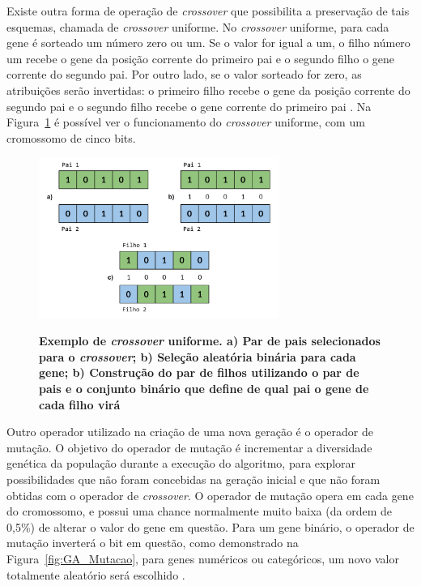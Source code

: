 \documentclass[12pt,oneside,a4paper,english,french,spanish,brazil,]{abntex2}
\begin{document}
Existe outra forma de operação de \textit{crossover} que possibilita a preservação de tais esquemas, chamada de \textit{crossover} uniforme. No \textit{crossover} uniforme, para cada gene é sorteado um número zero ou um. Se o valor for igual a um, o filho número um recebe o gene da posição corrente do primeiro pai e o segundo filho o gene corrente do segundo pai. Por outro lado, se o valor sorteado for zero, as atribuições serão invertidas: o primeiro filho recebe o gene da posição corrente do segundo pai e o segundo filho recebe o gene corrente do primeiro pai \cite{linden:2008}. Na Figura~\ref{fig:GA_Crossover_Uniforme} é possível ver o funcionamento do \textit{crossover} uniforme, com um cromossomo de cinco bits.

\begin{figure}[ht]
\centering
\caption{\textbf{Exemplo de \textit{crossover} uniforme. a) Par de pais selecionados para o \textit{crossover}; b) Seleção aleatória binária para cada gene; b) Construção do par de filhos utilizando o par de pais e o conjunto binário que define de qual pai o gene de cada filho virá}}
\includegraphics[width=0.7\textwidth]{imagens/GA_Crossover_Uniforme.pdf}
\label{fig:GA_Crossover_Uniforme}
\end{figure}

Outro operador utilizado na criação de uma nova geração é o operador de mutação. O objetivo do operador de mutação é incrementar a diversidade genética da população durante a execução do algoritmo, para explorar possibilidades que não foram concebidas na geração inicial e que não foram obtidas com o operador de \textit{crossover}. O operador de mutação opera em cada gene do cromossomo, e possui uma chance normalmente muito baixa (da ordem de 0,5\%) de alterar o valor do gene em questão. Para um gene binário, o operador de mutação inverterá o bit em questão, como demonstrado na Figura~\ref{fig:GA_Mutacao}, para genes numéricos ou categóricos, um novo valor totalmente aleatório será escolhido \cite{linden:2008}.
\end{document}
